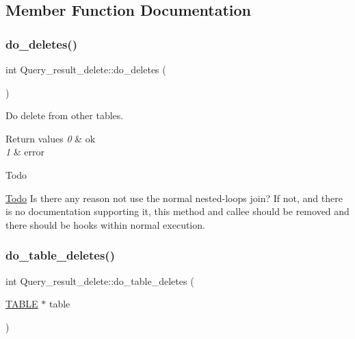 \subsection{Member Function Documentation}
\mbox{\label{classQuery__result__delete_a7e1b51ad966a65afa34e0fc07c5b7a63}} 
\subsubsection{\texorpdfstring{do\+\_\+deletes()}{do\_deletes()}}
{\footnotesize\ttfamily int Query\+\_\+result\+\_\+delete\+::do\+\_\+deletes (\begin{DoxyParamCaption}{ }\end{DoxyParamCaption})}

Do delete from other tables.


\begin{DoxyRetVals}{Return values}
{\em 0} & ok \\
\hline
{\em 1} & error\\
\hline
\end{DoxyRetVals}
\begin{DoxyRefDesc}{Todo}
\item[\mbox{\hyperlink{todo__todo000079}{Todo}}]Is there any reason not use the normal nested-\/loops join? If not, and there is no documentation supporting it, this method and callee should be removed and there should be hooks within normal execution. \end{DoxyRefDesc}
\mbox{\label{classQuery__result__delete_a3470143ccd887b6ad5bb21d4fe18ef51}} 
\subsubsection{\texorpdfstring{do\+\_\+table\+\_\+deletes()}{do\_table\_deletes()}}
{\footnotesize\ttfamily int Query\+\_\+result\+\_\+delete\+::do\+\_\+table\+\_\+deletes (\begin{DoxyParamCaption}\item[{\mbox{\hyperlink{structTABLE}{T\+A\+B\+LE}} $\ast$}]{table }\end{DoxyParamCaption})}

